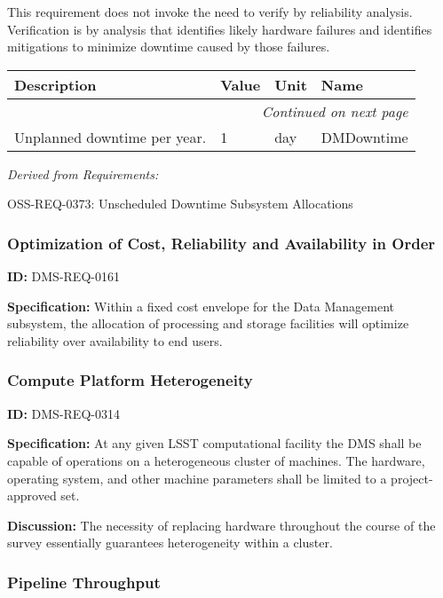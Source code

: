 \documentclass[SE,toc,lsstdraft]{lsstdoc}
\makeatletter
\newcommand{\paramname}[1]{\hspace{0pt}#1}
\newcommand{\unitname}[1]{\hspace{0pt}#1}
\newenvironment{parameters}[0]{%
\setlength\LTleft{0pt}
\setlength\LTright{\fill}
\begin{small}
\begin{longtable}[]{|p{0.5\textwidth}|l|p{0.6in}|p{1.74in}@{}|}

\hline \textbf{Description} & \textbf{Value} & \textbf{Unit} & \textbf{Name} \\ \hline
\endhead

\hline \multicolumn{4}{r}{\emph{Continued on next page}} \\
\endfoot

\hline\hline
\endlastfoot
}{%
\hline
\end{longtable}
\end{small}
}
\makeatother
\begin{document}
This requirement does not invoke the need to verify by reliability analysis. Verification is by analysis that identifies likely hardware failures and identifies mitigations to minimize downtime caused by those failures.



\begin{parameters}
Unplanned downtime per year.
&
1
&
\unitname{%
day
}
&
\paramname{%
DMDowntime
} \\\hline
\end{parameters}




\emph{Derived from Requirements:}

OSS-REQ-0373:
Unscheduled Downtime Subsystem Allocations \newline


\subsubsection{Optimization of Cost, Reliability and Availability in Order}

\label{DMS-REQ-0161}
\textbf{ID:} DMS-REQ-0161

\textbf{Specification:} Within a fixed cost envelope for the Data Management subsystem, the allocation of processing and storage facilities will optimize reliability over availability to end users.






\subsubsection{Compute Platform Heterogeneity}

\label{DMS-REQ-0314}
\textbf{ID:} DMS-REQ-0314

\textbf{Specification:} At any given LSST computational facility the DMS shall be capable of operations on a heterogeneous cluster of machines. The hardware, operating system, and other machine parameters shall be limited to a project-approved set.

\textbf{Discussion: }The necessity of replacing hardware throughout the course of the survey essentially guarantees heterogeneity within a cluster.




\subsubsection{Pipeline Throughput}
\end{document}
